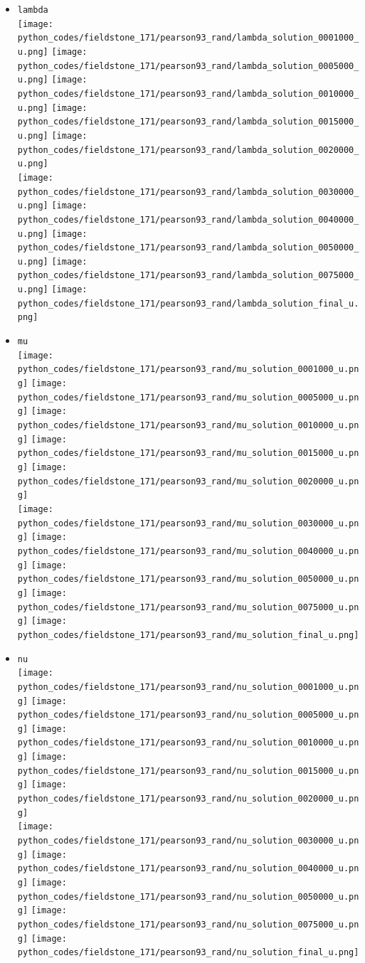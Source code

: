 \begin{itemize}
\item {\tt lambda}\\
\texttt{[image: python\_codes/fieldstone\_171/pearson93\_rand/lambda\_solution\_0001000\_u.png]}
\texttt{[image: python\_codes/fieldstone\_171/pearson93\_rand/lambda\_solution\_0005000\_u.png]}
\texttt{[image: python\_codes/fieldstone\_171/pearson93\_rand/lambda\_solution\_0010000\_u.png]}
\texttt{[image: python\_codes/fieldstone\_171/pearson93\_rand/lambda\_solution\_0015000\_u.png]}
\texttt{[image: python\_codes/fieldstone\_171/pearson93\_rand/lambda\_solution\_0020000\_u.png]}\\
\texttt{[image: python\_codes/fieldstone\_171/pearson93\_rand/lambda\_solution\_0030000\_u.png]}
\texttt{[image: python\_codes/fieldstone\_171/pearson93\_rand/lambda\_solution\_0040000\_u.png]}
\texttt{[image: python\_codes/fieldstone\_171/pearson93\_rand/lambda\_solution\_0050000\_u.png]}
\texttt{[image: python\_codes/fieldstone\_171/pearson93\_rand/lambda\_solution\_0075000\_u.png]}
\texttt{[image: python\_codes/fieldstone\_171/pearson93\_rand/lambda\_solution\_final\_u.png]}

\item {\tt mu}\\
\texttt{[image: python\_codes/fieldstone\_171/pearson93\_rand/mu\_solution\_0001000\_u.png]}
\texttt{[image: python\_codes/fieldstone\_171/pearson93\_rand/mu\_solution\_0005000\_u.png]}
\texttt{[image: python\_codes/fieldstone\_171/pearson93\_rand/mu\_solution\_0010000\_u.png]}
\texttt{[image: python\_codes/fieldstone\_171/pearson93\_rand/mu\_solution\_0015000\_u.png]}
\texttt{[image: python\_codes/fieldstone\_171/pearson93\_rand/mu\_solution\_0020000\_u.png]}\\
\texttt{[image: python\_codes/fieldstone\_171/pearson93\_rand/mu\_solution\_0030000\_u.png]}
\texttt{[image: python\_codes/fieldstone\_171/pearson93\_rand/mu\_solution\_0040000\_u.png]}
\texttt{[image: python\_codes/fieldstone\_171/pearson93\_rand/mu\_solution\_0050000\_u.png]}
\texttt{[image: python\_codes/fieldstone\_171/pearson93\_rand/mu\_solution\_0075000\_u.png]}
\texttt{[image: python\_codes/fieldstone\_171/pearson93\_rand/mu\_solution\_final\_u.png]}

\item {\tt nu}\\
\texttt{[image: python\_codes/fieldstone\_171/pearson93\_rand/nu\_solution\_0001000\_u.png]}
\texttt{[image: python\_codes/fieldstone\_171/pearson93\_rand/nu\_solution\_0005000\_u.png]}
\texttt{[image: python\_codes/fieldstone\_171/pearson93\_rand/nu\_solution\_0010000\_u.png]}
\texttt{[image: python\_codes/fieldstone\_171/pearson93\_rand/nu\_solution\_0015000\_u.png]}
\texttt{[image: python\_codes/fieldstone\_171/pearson93\_rand/nu\_solution\_0020000\_u.png]}\\
\texttt{[image: python\_codes/fieldstone\_171/pearson93\_rand/nu\_solution\_0030000\_u.png]}
\texttt{[image: python\_codes/fieldstone\_171/pearson93\_rand/nu\_solution\_0040000\_u.png]}
\texttt{[image: python\_codes/fieldstone\_171/pearson93\_rand/nu\_solution\_0050000\_u.png]}
\texttt{[image: python\_codes/fieldstone\_171/pearson93\_rand/nu\_solution\_0075000\_u.png]}
\texttt{[image: python\_codes/fieldstone\_171/pearson93\_rand/nu\_solution\_final\_u.png]}


\end{itemize}

